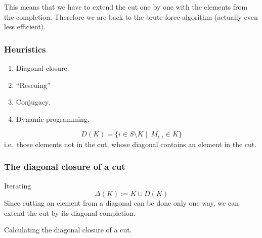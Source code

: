 \documentclass{beamer}
\newcommand{\jump}{\vskip6pt}
\begin{document}
\begin{frame}
\begin{center}
\begin{tabular}{@{}c@{}c@{}c@{}c@{}c@{}c@{}}
\end{tabular}%
\end{center} 

This means that we have to extend the cut one by one with the elements from the completion. Therefore we are back to the brute-force algorithm (actually even less efficient).
\end{frame}

\begin{frame}\frametitle{Heuristics}
\begin{enumerate}
\item Diagonal closure.
\item ``Rescuing''
\item Conjugacy.
\item Dynamic programming.
\end{enumerate}
\end{frame}

\begin{frame}[fragile]
\begin{definition}
$$D(K)=\{i\in S\setminus K \mid\ M_{i,i}\in K \} $$
\noindent i.e.\ those elements not in the cut, whose diagonal contains an element in the cut.
\end{definition}

\end{frame}

\begin{frame}[fragile]\frametitle{The diagonal closure of a cut}
Iterating 
$$ \Delta(K):=K\cup D(K)$$
Since cutting an element from a diagonal can be done only one way, we can extend the cut by its diagonal completion.
\begin{algorithm}[H]
\caption{Calculating the diagonal closure of a cut.}
\label{alg:diagonalclosure}
\end{algorithm}
\end{frame}
\end{document}
